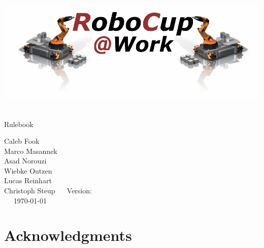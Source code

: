 
\begin{titlepage}
  \begin{center}
    {

      \includegraphics[width=\textwidth]{images/logo_RoboCupAtWork.pdf}\\[1.23ex]
    }
    \vspace{2.7 cm}
    \hrulefill\par
    {%
      \vspace*{.27cm}
      \Huge{\RCAW}\\[1.23ex]
      \Large Rulebook \\[2ex]
    }

    \hrulefill\par

    \vfill
    Caleb Fook \\
    Marco Masannek\\
    Asad Norouzi\\
    Wiebke Outzen\\
    Lucas Reinhart\\
    Christoph Steup
    \vfill
    ~~ Version: \YEAR ~~ \\
    ~~  \today ~~ \\
  \end{center}

\newpage

\section*{Acknowledgments}


\end{titlepage}
